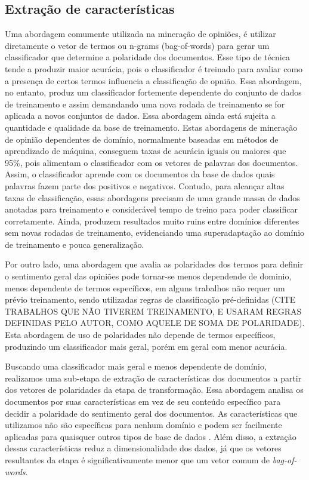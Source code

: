 \documentclass[template.tex]{subfiles}
\begin{document}
\subsection{Extração de características}

Uma abordagem comumente utilizada na mineração de opiniões, é utilizar diretamente o vetor de termos ou n-grams (bag-of-words) para gerar um classificador que determine a polaridade dos documentos. Esse tipo de técnica tende a produzir maior acurácia, pois o classificador é treinado para avaliar como a presença de certos termos influencia a classificação de opnião. Essa abordagem, no entanto, produz um classificador fortemente dependente do conjunto de dados de treinamento e assim demandando uma nova rodada de treinamento se for aplicada a novos conjuntos de dados. Essa abordagem ainda está sujeita a quantidade e qualidade da base de treinamento. Estas abordagens de mineração de opinião dependentes de domínio, normalmente baseadas em métodos de aprendizado de máquina, conseguem taxas de acurácia iguais ou maiores que 95\%, pois alimentam o classificador com os vetores de palavras dos documentos. Assim, o classificador aprende com os documentos da base de dados quais palavras fazem parte dos positivos e negativos. Contudo, para alcançar altas taxas de classificação, essas abordagens precisam de uma grande massa de dados anotadas para treinamento e considerável tempo de treino para poder classificar corretamente. Ainda, produzem resultados muito ruins entre domínios diferentes sem novas rodadas de treinamento, evidenciando uma superadaptação ao domínio de treinamento e pouca generalização.


Por outro lado, uma abordagem que avalia as polaridades dos termos para definir o sentimento geral das opiniões pode tornar-se menos dependende de dominio, menos dependente de termos específicos, em alguns trabalhos não requer um prévio treinamento, sendo utilizadas regras de classificação pré-definidas (CITE TRABALHOS QUE NÃO TIVEREM TREINAMENTO, E USARAM REGRAS DEFINIDAS PELO AUTOR, COMO AQUELE DE SOMA DE POLARIDADE). Esta abordagem de uso de polaridades não depende de termos específicos, produzindo um classificador mais geral, porém em geral com menor acurácia. 


Buscando uma classificador mais geral e menos dependente de domínio, realizamos uma sub-etapa de extração de características dos documentos a partir dos vetores de polaridades da etapa de transformação. Essa abordagem analisa os documentos por suas características em vez de seu conteúdo específico para decidir a polaridade do sentimento geral dos documentos. As características que utilizamos não são específicas para nenhum domínio e podem ser facilmente aplicadas para quaisquer outros tipos de base de dados \cite{pang2002thumbs}. Além disso, a extração dessas características reduz a dimensionalidade dos dados, já que os vetores resultantes da etapa é significativamente menor que um vetor comum de \textit{bag-of-words}.
\end{document}
